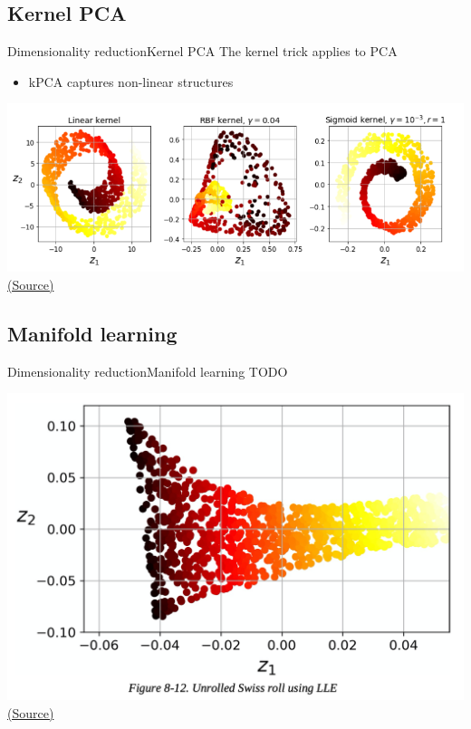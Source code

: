 \documentclass[10pt,compress]{beamer} %
\begin{document}
\subsection{Kernel PCA}
\begin{frame}{Dimensionality reduction}{Kernel PCA}
	The kernel trick applies to PCA
		\begin{itemize}
        \item kPCA captures non-linear structures
		\end{itemize}

	\includegraphics[width=\linewidth]{figs/kpca.png}
   	\centering \tiny{\href{https://www.oreilly.com/library/view/hands-on-machine-learning/9781492032632/}{(Source)}}
\end{frame}

\subsection{Manifold learning}
\begin{frame}{Dimensionality reduction}{Manifold learning}
	TODO

	\includegraphics[width=\linewidth]{figs/lle.png}
   	\centering \tiny{\href{https://github.com/Akramz/Hands-on-Machine-Learning-with-Scikit-Learn-Keras-and-TensorFlow/blob/master/08.Dim_Reduction.ipynb}{(Source)}}
\end{frame}
\end{document}
